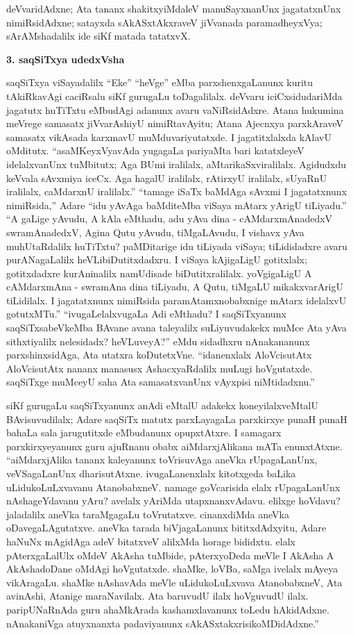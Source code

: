 deVvaridAdxne; Ata tananx shakitxyiMdaleV manuSayxnanUnx jagatatxnUnx nimiRsidAdxne; satayxda sAkASxtAkxraveV jiVvanada paramadheyxVya; sArAMshadalilx ide siKf matada tatatxvX.

\bigskip
\begin{center}
{\Large\bf 3. saqSiTxya udedxVsha}
\end{center}

saqSiTxya viSayadalilx ``Eke'' ``heVge'' eMba parxshenxgaLanunx kuritu tAkiRkavAgi caciRsalu siKf gurugaLu toDagalilalx. deVvaru iciCxsidudariMda jagatutx huTiTxtu eMbudAgi adanunx avaru vaNiRsidAdxre. Atana hukumina meVrege samasatx jiVvarAshiyU nimiRtavAyitu; Atana Ajecnxya parxkAraveV samasatx vikAsada karxmavU muMduvariyutatxde. I jagatitxlalxda kAlavU oMditutx. ``asaMKeyxVyavAda yugagaLa pariyaMta bari katatxleyeV idelalxvanUnx tuMbitutx; Aga BUmi iralilalx, aMtarikaSxviralilalx. Agidudxdu keVvala sAvxmiya iceCx. Aga hagalU iralilalx, rAtirxyU iralilalx, sUyaRnU iralilalx, caMdarxnU iralilalx.'' ``tamage iSaTx baMdAga sAvxmi I jagatatxnunx nimiRsida,'' Adare ``idu yAvAga baMditeMba viSaya mAtarx yArigU tiLiyadu.'' ``A gaLige yAvudu, A kAla eMthadu, adu yAva dina - cAMdarxmAnadedxV swramAnadedxV, Agina Qutu yAvudu, tiMgaLAvudu, I vishavx yAva muhUtaRdalilx huTiTxtu? paMDitarige idu tiLiyada viSaya; tiLididadxre avaru purANagaLalilx heVLibiDutitxdadxru. I viSaya kAjigaLigU gotitxlalx; gotitxdadxre kurAninalilx namUdisade biDutitxralilalx. yoVgigaLigU A cAMdarxmAna - swramAna dina tiLiyadu, A Qutu, tiMgaLU mikakxvarArigU tiLidilalx. I jagatatxnunx nimiRsida paramAtamxnobabxnige mAtarx idelalxvU gotutxMTu.'' ``ivugaLelalxvugaLa Adi eMthadu? I saqSiTxyanunx saqSiTxsabeVkeMba BAvane avana taleyalilx suLiyuvudakekx muMce Ata yAva sithxtiyalilx nelesidadx? heVLuveyA?'' eMdu sidadhxru nAnakananunx parxshinxsidAga, Ata utatxra koDutetxVne. ``idanenxlalx AloVcisutAtx AloVcisutAtx nananx manasusx AshacxyaRdalilx muLugi hoVgutatxde. saqSiTxge muMceyU saha Ata samasatxvanUnx vAyxpisi niMtidadxnu.''

siKf gurugaLu saqSiTxyanunx anAdi eMtalU adakekx koneyilalxveMtalU BAvisuvudilalx; Adare saqSiTx matutx parxLayagaLa parxkirxye punaH punaH bahaLa sala jarugutitxde eMbudanunx opupxtAtxre. I samagarx parxkirxyeyanunx guru ajuRnanu obabx aiMdarxjAlikana mATa enunxtAtxne. ``aiMdarxjAlika tananx kaleyanunx toVrisuvAga aneVka rUpagaLanUnx, veVSagaLanUnx dharisutAtxne. ivugaLanenxlalx kitotxgeda baLika uLidukoLuLxvavanu AtanobabxneV. namage goVcarisida elalx rUpagaLanUnx nAshageYdavanu yAru? avelalx yAriMda utapxnanxvAdavu. elilxge hoVdavu? jaladalilx aneVka taraMgagaLu toVrutatxve. cinanxdiMda aneVka oDavegaLAgutatxve. aneVka tarada biVjagaLanunx bititxdAdxyitu, Adare haNuNx mAgidAga adeV bitatxveV alilxMda horage bididxtu. elalx pAterxgaLalUlx oMdeV AkAsha tuMbide, pAterxyoDeda meVle I AkAsha A AkAshadoDane oMdAgi hoVgutatxde. shaMke, loVBa, saMga ivelalx mAyeya vikAragaLu. shaMke nAshavAda meVle uLidukoLuLxvava AtanobabxneV, Ata avinAshi, Atanige maraNavilalx. Ata baruvudU ilalx hoVguvudU ilalx. paripUNaRnAda guru ahaMkArada kashamxlavanunx toLedu hAkidAdxne. nAnakaniVga atuyxnanxta padaviyanunx sAkASxtakxrisikoMDidAdxne.''

